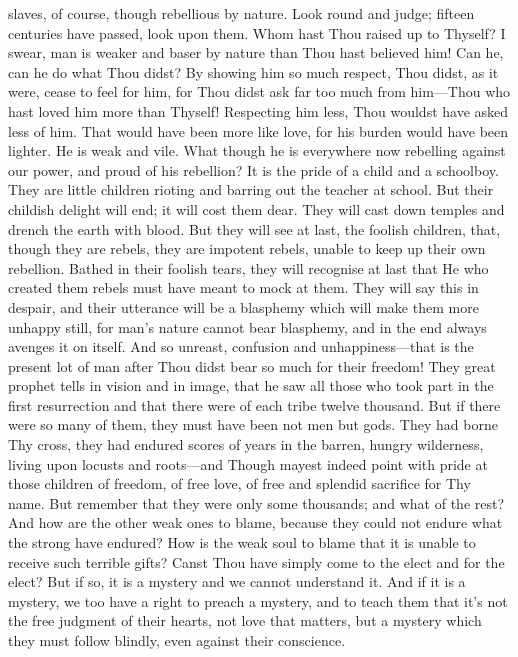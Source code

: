 slaves, of course, though rebellious by nature. Look round and judge;
fifteen centuries have passed, look upon them. Whom hast Thou raised
up to Thyself? I swear, man is weaker and baser by nature than Thou
hast believed him! Can he, can he do what Thou didst? By showing him
so much respect, Thou didst, as it were, cease to feel for him, for
Thou didst ask far too much from him---Thou who hast loved him more
than Thyself! Respecting him less, Thou wouldst have asked less of
him. That would have been more like love, for his burden would have
been lighter. He is weak and vile. What though he is everywhere now
rebelling against our power, and proud of his rebellion? It is the
pride of a child and a schoolboy. They are little children rioting and
barring out the teacher at school. But their childish delight will
end; it will cost them dear. They will cast down temples and drench
the earth with blood. But they will see at last, the foolish children,
that, though they are rebels, they are impotent rebels, unable to keep
up their own rebellion. Bathed in their foolish tears, they will
recognise at last that He who created them rebels must have meant to
mock at them. They will say this in despair, and their utterance will
be a blasphemy which will make them more unhappy still, for man's
nature cannot bear blasphemy, and in the end always avenges it on
itself. And so unreast, confusion and un\-hap\-pi\-ness---that is the
present lot of man after Thou didst bear so much for their freedom!
They great prophet tells in vision and in image, that he saw all those
who took part in the first resurrection and that there were of each
tribe twelve thousand. But if there were so many of them, they must
have been not men but gods. They had borne Thy cross, they had endured
scores of years in the barren, hungry wilderness, living upon locusts
and roots---and Though mayest indeed point with pride at those
children of freedom, of free love, of free and splendid sacrifice for
Thy name. But remember that they were only some thousands; and what of
the rest? And how are the other weak ones to blame, because they could
not endure what the strong have endured? How is the  weak
soul to blame that it is unable to receive such terrible gifts? Canst
Thou have simply come to the elect and for the elect? But if so, it is
a mystery and we cannot understand it. And if it is a mystery, we
too have a right to preach a mystery, and to teach them that it's not
the free judgment of their hearts, not love that matters, but a
mystery which they must follow blindly, even against their conscience.
